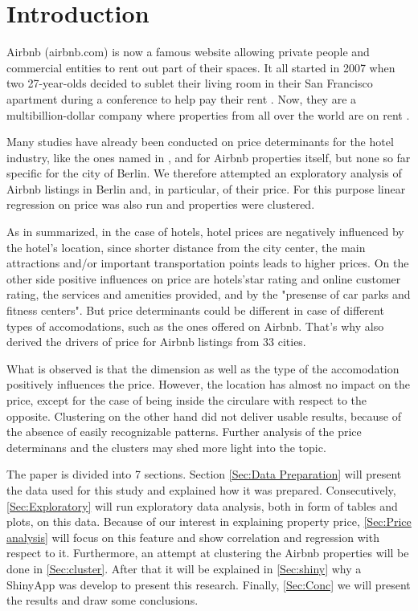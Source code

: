 \section{Introduction}

Airbnb (airbnb.com) is now a famous website allowing private people and commercial entities to rent out part of their spaces. It all started in 2007 when two 27-year-olds decided to sublet their living room in their San Francisco apartment during a conference to help pay their rent \citep{airbnbstory:2012}. Now, they are a multibillion-dollar company where properties from all over the world are on rent \citep{businessinsider}.

Many studies have already been conducted on price determinants for the hotel industry, like the ones named in \cite{wang2017price}, and for Airbnb properties \cite{wang2017price} itself, but none so far specific for the city of Berlin. We therefore attempted an exploratory analysis of Airbnb listings in Berlin and, in particular, of their price. For this purpose linear regression on price was also run and properties were clustered.

As in \cite{wang2017price} summarized, in the case of hotels, hotel prices are negatively influenced by the hotel's location, since shorter distance from the city center, the main attractions and/or important transportation points leads to higher prices. On the other side positive influences on price are hotels'star rating and online customer rating, the services and amenities provided, and by the "presense of car parks and fitness centers". But price determinants could be different in case of different types of accomodations, such as the ones offered on Airbnb. That's why \cite{wang2017price} also derived the drivers of price for Airbnb listings from 33 cities.

What is observed is that the dimension as well as the type of the accomodation positively influences the price. However, the location has almost no impact on the price, except for the case of being inside the circulare with respect to the opposite. Clustering on the other hand did not deliver usable results,  because of the absence of easily recognizable patterns. Further analysis of the price determinans and the clusters may shed more light into the topic.


The paper is divided into 7 sections. Section \ref{Sec:Data Preparation} will present the data used for this study and explained how it was prepared. Consecutively, \ref{Sec:Exploratory} will run exploratory data analysis, both in form of tables and plots, on this data. Because of our interest in explaining property price, \ref{Sec:Price analysis} will focus on this feature and show correlation and regression with respect to it. Furthermore, an attempt at clustering the Airbnb properties will be done in \ref{Sec:cluster}. After that it will be explained in \ref{Sec:shiny} why a ShinyApp was develop to present this research. Finally, \ref{Sec:Conc} we will present the results and draw some conclusions.
